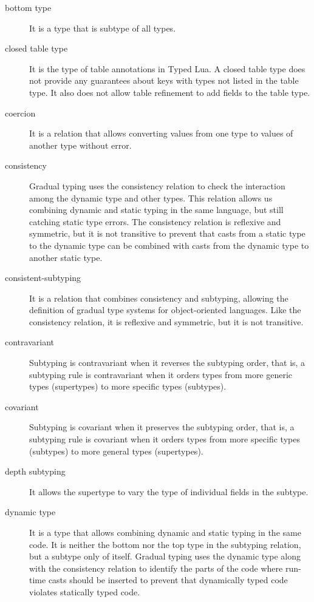 \begin{description}
\item[bottom type] It is a type that is subtype of all types.

\item[closed table type] It is the type of table annotations in Typed Lua.
A closed table type does not provide any guarantees about keys
with types not listed in the table type.
It also does not allow table refinement to add fields to the table type. 

\item[coercion] It is a relation that allows converting values from one type to values
of another type without error.

\item[consistency] Gradual typing uses the consistency relation to check the interaction
among the dynamic type and other types.
This relation allows us combining dynamic and static typing in the
same language, but still catching static type errors.
The consistency relation is reflexive and symmetric, but it is not transitive
to prevent that casts from a static type to the dynamic type can be
combined with casts from the dynamic type to another static type. 

\item[consistent-subtyping] It is a relation that combines consistency and subtyping, allowing
the definition of gradual type systems for object-oriented languages.
Like the consistency relation, it is reflexive and symmetric, but it is not transitive.

\item[contravariant] Subtyping is contravariant when it reverses the subtyping order,
that is, a subtyping rule is contravariant when it orders
types from more generic types (supertypes) to more specific types (subtypes).

\item[covariant] Subtyping is covariant when it preserves the subtyping order,
that is, a subtyping rule is covariant when it orders
types from more specific types (subtypes) to more general types (supertypes).

\item[depth subtyping] It allows the supertype to vary the type of individual fields in the subtype.

\item[dynamic type] It is a type that allows combining dynamic and static typing in the same code.
It is neither the bottom nor the top type in the subtyping relation, but
a subtype only of itself.
Gradual typing uses the dynamic type along with the consistency relation to
identify the parts of the code where run-time casts should be inserted to
prevent that dynamically typed code violates statically typed code.


\end{description}
